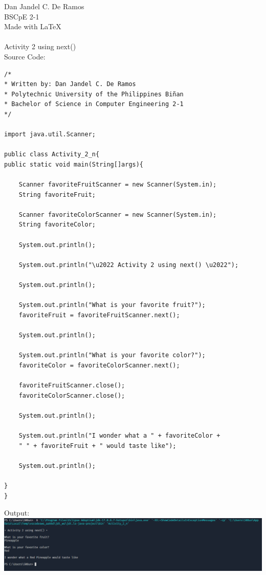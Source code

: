 \documentclass[12pt]{article}
\begin{document}
 
	\noindent
	Dan Jandel C. De Ramos\\
	BSCpE 2-1\\
	Made with \LaTeX \\
	\\
	Activity 2 using next()\\
	Source Code:
			
	\begin{verbatim}         
/*
* Written by: Dan Jandel C. De Ramos
* Polytechnic University of the Philippines Biñan
* Bachelor of Science in Computer Engineering 2-1
*/

import java.util.Scanner;

public class Activity_2_n{
public static void main(String[]args){
	
	Scanner favoriteFruitScanner = new Scanner(System.in);
	String favoriteFruit;
	
	Scanner favoriteColorScanner = new Scanner(System.in);
	String favoriteColor;
	
	System.out.println();
	
	System.out.println("\u2022 Activity 2 using next() \u2022");
	
	System.out.println();
	
	System.out.println("What is your favorite fruit?");
	favoriteFruit = favoriteFruitScanner.next();    
	
	System.out.println();
	
	System.out.println("What is your favorite color?");
	favoriteColor = favoriteColorScanner.next();
	
	favoriteFruitScanner.close();
	favoriteColorScanner.close();
	
	System.out.println();        
	
	System.out.println("I wonder what a " + favoriteColor +
	" " + favoriteFruit + " would taste like");
	
	System.out.println();
	
}
}
	\end{verbatim}
	\clearpage
	\noindent
	Output:\\
	\includegraphics[width=\textwidth]{output2n}
\end{document}
